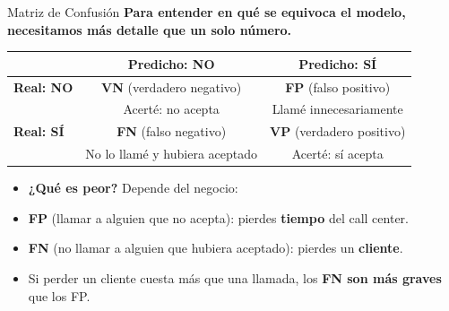 \documentclass[aspectratio=169, 11pt]{beamer}
\begin{document}
\begin{frame}[shrink=8]{Matriz de Confusión}
  \vspace{-4pt}
  {\footnotesize\color{arcaDark}\bfseries
    Para entender \textbf{en qué se equivoca} el modelo, necesitamos
    más detalle que un solo número.}

  \vspace{6pt}
  \begin{center}
  {\scriptsize
  \begin{tabular}{@{}l|cc@{}}
    & \textbf{Predicho: NO} & \textbf{Predicho: SÍ} \\
    \midrule
    \textbf{Real: NO} &
      {\color{codeGreen}\bfseries VN} (verdadero negativo) &
      {\color{codeOrange}\bfseries FP} (falso positivo) \\
    & Acerté: no acepta & Llamé innecesariamente \\
    \midrule
    \textbf{Real: SÍ} &
      {\color{arcaRed}\bfseries FN} (falso negativo) &
      {\color{codeGreen}\bfseries VP} (verdadero positivo) \\
    & No lo llamé y hubiera aceptado & Acerté: sí acepta \\
  \end{tabular}
  }
  \end{center}

  \vspace{6pt}
  {\footnotesize
  \begin{itemize}\setlength{\itemsep}{5pt}
    \item[{\color{arcaRed}\faArrowRight}]
      \textbf{¿Qué es peor?} Depende del negocio:
    \item[{\color{codeOrange}\scriptsize\faArrowRight}]
      \textbf{FP} (llamar a alguien que no acepta): pierdes \textbf{tiempo} del call center.
    \item[{\color{arcaRed}\scriptsize\faArrowRight}]
      \textbf{FN} (no llamar a alguien que hubiera aceptado): pierdes un \textbf{cliente}.
    \item[{\color{arcaRed}\scriptsize\faArrowRight}]
      Si perder un cliente cuesta más que una llamada, los \textbf{FN
      son más graves} que los FP.
  \end{itemize}
  }
\end{frame}
\end{document}
